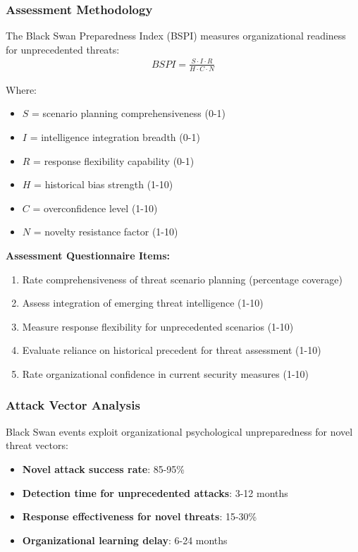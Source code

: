 \documentclass[11pt,a4paper]{article}
\begin{document}
\subsubsection{Assessment Methodology}

The Black Swan Preparedness Index (BSPI) measures organizational readiness for unprecedented threats:
\begin{align}
BSPI = \frac{S \cdot I \cdot R}{H \cdot C \cdot N}
\end{align}

Where:
\begin{itemize}
\item $S$ = scenario planning comprehensiveness (0-1)
\item $I$ = intelligence integration breadth (0-1)
\item $R$ = response flexibility capability (0-1)
\item $H$ = historical bias strength (1-10)
\item $C$ = overconfidence level (1-10)
\item $N$ = novelty resistance factor (1-10)
\end{itemize}

\textbf{Assessment Questionnaire Items:}
\begin{enumerate}
\item Rate comprehensiveness of threat scenario planning (percentage coverage)
\item Assess integration of emerging threat intelligence (1-10)
\item Measure response flexibility for unprecedented scenarios (1-10)
\item Evaluate reliance on historical precedent for threat assessment (1-10)
\item Rate organizational confidence in current security measures (1-10)
\end{enumerate}

\subsubsection{Attack Vector Analysis}

Black Swan events exploit organizational psychological unpreparedness for novel threat vectors:

\begin{itemize}
\item \textbf{Novel attack success rate}: 85-95\%
\item \textbf{Detection time for unprecedented attacks}: 3-12 months
\item \textbf{Response effectiveness for novel threats}: 15-30\%
\item \textbf{Organizational learning delay}: 6-24 months
\end{itemize}
\end{document}
